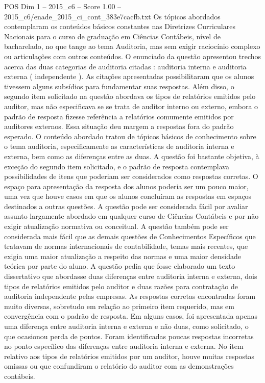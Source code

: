 \begin{textsample}{POS Dim 1 – 2015\_c6 – Score 1.00 – 2015\_c6/enade\_2015\_ci\_cont\_383e7cacfb.txt}
Os tópicos abordados contemplaram os conteúdos básicos constantes nas Diretrizes Curriculares Nacionais para o curso de graduação em Ciências Contábeis, nível de bacharelado, no que tange ao tema Auditoria, mas sem exigir raciocínio complexo ou articulações com outros conteúdos.
O enunciado da questão apresentou trechos acerca das duas categorias de auditoria citadas : auditoria interna e auditoria externa ( independente ).
As citações apresentadas possibilitaram que os alunos tivessem alguns subsídios para fundamentar suas respostas.
Além disso, o segundo item solicitado na questão abordava os tipos de relatórios emitidos pelo auditor, mas não especificava se se trata de auditor interno ou externo, embora o padrão de resposta fizesse referência a relatórios comumente emitidos por auditores externos.
Essa situação deu margem a respostas fora do padrão esperado.
O conteúdo abordado tratou de tópicos básicos de conhecimento sobre o tema auditoria, especificamente as características de auditoria interna e externa, bem como as diferenças entre as duas.
A questão foi bastante objetiva, à exceção do segundo item solicitado, e o padrão de resposta contemplava possibilidades de itens que poderiam ser considerados como respostas corretas.
O espaço para apresentação da resposta dos alunos poderia ser um pouco maior, uma vez que houve casos em que os alunos concluíram as respostas em espaços destinados a outras questões.
A questão pode ser considerada fácil por avaliar assunto largamente abordado em qualquer curso de Ciências Contábeis e por não exigir atualização normativa ou conceitual.
A questão também pode ser considerada mais fácil que as demais questões de Conhecimentos Específicos que tratavam de normas internacionais de contabilidade, temas mais recentes, que exigia uma maior atualização a respeito das normas e uma maior densidade teórica por parte do aluno.
A questão pedia que fosse elaborado um texto dissertativo que abordasse duas diferenças entre auditoria interna e externa, dois tipos de relatórios emitidos pelo auditor e duas razões para contratação de auditoria independente pelas empresas.
As respostas corretas encontradas foram muito diversas, sobretudo em relação ao primeiro item requerido, mas em convergência com o padrão de resposta.
Em alguns casos, foi apresentada apenas uma diferença entre auditoria interna e externa e não duas, como solicitado, o que ocasionou perda de pontos.
Foram identificadas poucas respostas incorretas no ponto específico das diferenças entre auditoria interna e externa.
No item relativo aos tipos de relatórios emitidos por um auditor, houve muitas respostas omissas ou que confundiram o relatório do auditor com as demonstrações contábeis.

\end{textsample}
